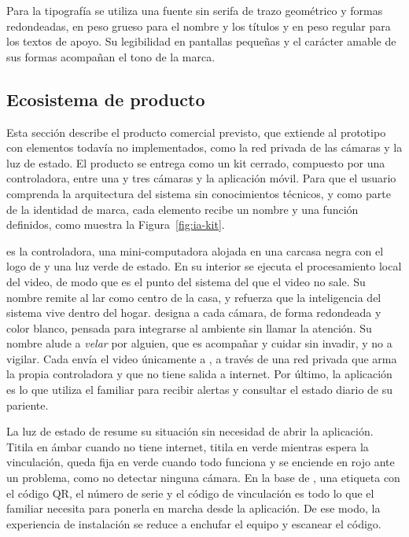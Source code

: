 Para la tipografía se utiliza una fuente sin serifa de trazo geométrico y formas redondeadas, en peso grueso para el nombre y los títulos y en peso regular para los textos de apoyo.
Su legibilidad en pantallas pequeñas y el carácter amable de sus formas acompañan el tono de la marca.


\subsection{Ecosistema de producto}
\label{sec:branding-ecosistema}

Esta sección describe el producto comercial previsto, que extiende al prototipo con elementos todavía no implementados, como la red privada de las cámaras y la luz de estado.
El producto se entrega como un kit cerrado, compuesto por una controladora, entre una y tres cámaras y la aplicación móvil.
Para que el usuario comprenda la arquitectura del sistema sin conocimientos técnicos, y como parte de la identidad de marca, cada elemento recibe un nombre y una función definidos, como muestra la Figura~\ref{fig:ia-kit}.

\modcont{} es la controladora, una mini-computadora alojada en una carcasa negra con el logo de \marca{} y una luz verde de estado.
En su interior se ejecuta el procesamiento local del video, de modo que es el punto del sistema del que el video no sale.
Su nombre remite al lar como centro de la casa, y refuerza que la inteligencia del sistema vive dentro del hogar.
\modcam{} designa a cada cámara, de forma redondeada y color blanco, pensada para integrarse al ambiente sin llamar la atención.
Su nombre alude a \emph{velar} por alguien, que es acompañar y cuidar sin invadir, y no a vigilar.
Cada \modcam{} envía el video únicamente a \modcont{}, a través de una red privada que arma la propia controladora y que no tiene salida a internet.
Por último, la aplicación \marca{} es lo que utiliza el familiar para recibir alertas y consultar el estado diario de su pariente.

La luz de estado de \modcont{} resume su situación sin necesidad de abrir la aplicación.
Titila en ámbar cuando no tiene internet, titila en verde mientras espera la vinculación, queda fija en verde cuando todo funciona y se enciende en rojo ante un problema, como no detectar ninguna cámara.
En la base de \modcont{}, una etiqueta con el código QR, el número de serie y el código de vinculación es todo lo que el familiar necesita para ponerla en marcha desde la aplicación.
De ese modo, la experiencia de instalación se reduce a enchufar el equipo y escanear el código.

